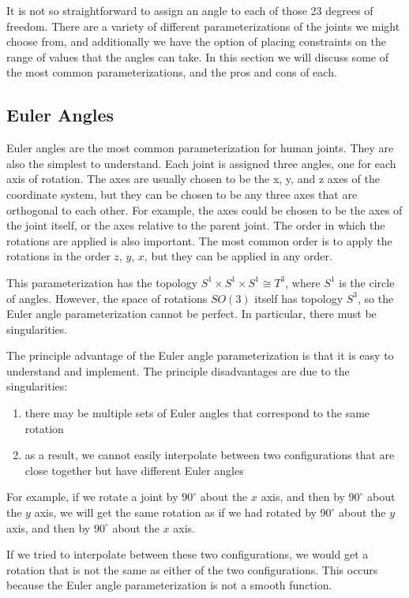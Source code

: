 It is not so straightforward to assign an angle to each of those 23 degrees of freedom. There are a variety of different parameterizations of the joints we might choose from, and additionally we have the option of placing constraints on the range of values that the angles can take. In this section we will discuss some of the most common parameterizations, and the pros and cons of each.

\subsection{Euler Angles}

Euler angles are the most common parameterization for human joints. They are also the simplest to understand. Each joint is assigned three angles, one for each axis of rotation. The axes are usually chosen to be the x, y, and z axes of the coordinate system, but they can be chosen to be any three axes that are orthogonal to each other.  For example, the axes could be chosen to be the axes of the joint itself, or the axes relative to the parent joint. The order in which the rotations are applied is also important. The most common order is to apply the rotations in the order $z$, $y$, $x$, but they can be applied in any order.

This parameterization has the topology $S^1 \times S^1 \times S^1 ≅ T^3$, where $S^1$ is the circle of angles. However, the space of rotations $SO(3)$ itself has topology $S^3$, so the Euler angle parameterization cannot be perfect. In particular, there must be singularities.

The principle advantage of the Euler angle parameterization is that it is easy to understand and implement. The principle disadvantages are due to the singularities:
\begin{enumerate}
    \item there may be multiple sets of Euler angles that correspond to the same rotation
    \item as a result, we cannot easily interpolate between two configurations that are close together but have different Euler angles
\end{enumerate}

For example, if we rotate a joint by $90^\circ$ about the $x$ axis, and then by $90^\circ$ about the $y$ axis, we will get the same rotation as if we had rotated by $90^\circ$ about the $y$ axis, and then by $90^\circ$ about the $x$ axis. 

If we tried to interpolate between these two configurations, we would get a rotation that is not the same as either of the two configurations. This occurs because the Euler angle parameterization is not a smooth function.


